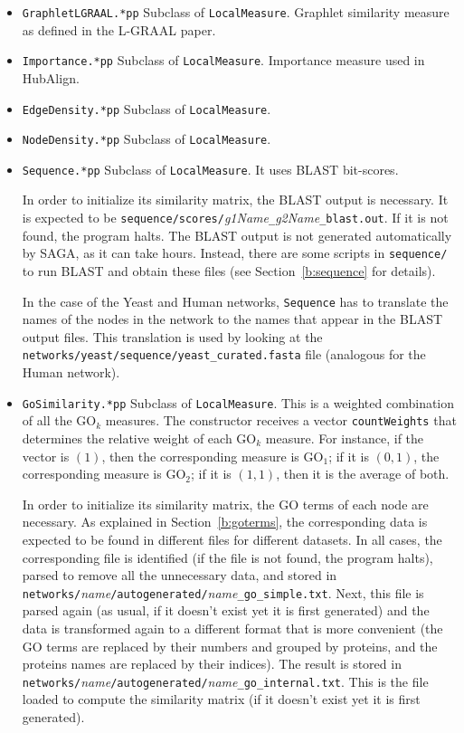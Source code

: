 \documentclass[]{article}
\begin{document}
\begin{itemize}
\item \texttt{GraphletLGRAAL.*pp} Subclass of \texttt{LocalMeasure}. Graphlet similarity measure as defined in the L-GRAAL paper.

\item \texttt{Importance.*pp} Subclass of \texttt{LocalMeasure}. Importance measure used in HubAlign.

\item \texttt{EdgeDensity.*pp} Subclass of \texttt{LocalMeasure}.

\item \texttt{NodeDensity.*pp} Subclass of \texttt{LocalMeasure}.

\item \texttt{Sequence.*pp} Subclass of \texttt{LocalMeasure}. It uses BLAST bit-scores.

In order to initialize its similarity matrix, the BLAST output is necessary. It is expected to be \texttt{sequence/scores/}\textit{g1Name}\texttt{\_}\textit{g2Name}\texttt{\_blast.out}. If it is not found, the program halts. The BLAST output is not generated automatically by SAGA, as it can take hours. Instead, there are some scripts in \texttt{sequence/} to run BLAST and obtain these files (see Section~\ref{b:sequence} for details).

In the case of the Yeast and Human networks, \texttt{Sequence} has to translate the names of the nodes in the network to the names that appear in the BLAST output files. This translation is used by looking at the \texttt{networks/yeast/sequence/yeast\_curated.fasta} file (analogous for the Human network).

\item \texttt{GoSimilarity.*pp} Subclass of \texttt{LocalMeasure}. This is a weighted combination of all the $\mbox{GO}_k$ measures. The constructor receives a vector \texttt{countWeights} that determines the relative weight of each $\mbox{GO}_k$ measure. For instance, if the vector is $(1)$, then the corresponding measure is $\mbox{GO}_1$; if it is $(0,1)$, the corresponding measure is $\mbox{GO}_2$; if it is $(1,1)$, then it is the average of both.

In order to initialize its similarity matrix, the GO terms of each node are necessary. As explained in Section~\ref{b:goterms}, the corresponding data is expected to be found in different files for different datasets. In all cases, the corresponding file is identified (if the file is not found, the program halts), parsed to remove all the unnecessary data, and stored in\\ \texttt{networks/}\textit{name}\texttt{/autogenerated/}\textit{name}\texttt{\_go\_simple.txt}. Next, this file is parsed again (as usual, if it doesn't exist yet it is first generated) and the data is transformed again to a different format that is more convenient (the GO terms are replaced by their numbers and grouped by proteins, and the proteins names are replaced by their indices). The result is stored in \texttt{networks/}\textit{name}\texttt{/autogenerated/}\textit{name}\texttt{\_go\_internal.txt}. This is the file loaded to compute the similarity matrix (if it doesn't exist yet it is first generated).


\end{itemize}
\end{document}

